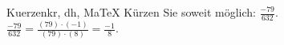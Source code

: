\begin{MAufgabe}{Kuerzen}{kr, dh, MaTeX}
K\"urzen Sie soweit m\"oglich: $\frac{-79}{632}$.\\ 
\ifLsg\MLoesung
\quad $\frac{-79}{632}=\frac{(79)\cdot(-1)}{(79)\cdot(8)}=\frac{-1}{8}$.\else\relax\fi
 \end{MAufgabe}